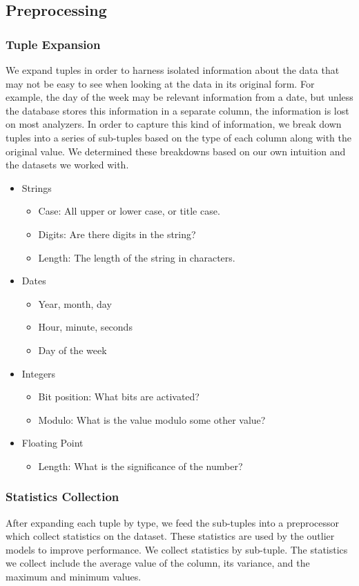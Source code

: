 \documentclass{vldb}
\begin{document}
\subsection{Preprocessing}
\subsubsection{Tuple Expansion}
We expand tuples in order to harness isolated information about the data that may not be easy to see when looking at the data in its original form.
For example, the day of the week may be relevant information from a date, but unless the database stores this information in a separate column, the information is lost on most analyzers.
In order to capture this kind of information, we break down tuples into a series of sub-tuples based on the type of each column along with the original value.
We determined these breakdowns based on our own intuition and the datasets we worked with.

\begin{itemize}
\item Strings
\begin{itemize}
\item Case: All upper or lower case, or title case.
\item Digits: Are there digits in the string?
\item Length: The length of the string in characters.
\end{itemize}
\item Dates
\begin{itemize}
\item Year, month, day
\item Hour, minute, seconds
\item Day of the week
\end{itemize}
\item Integers
\begin{itemize}
\item Bit position: What bits are activated?
\item Modulo: What is the value modulo some other value?
\end{itemize}
\item Floating Point
\begin{itemize}
\item Length: What is the significance of the number?
\end{itemize}
\end{itemize}

\subsubsection{Statistics Collection}
After expanding each tuple by type, we feed the sub-tuples into a preprocessor which collect statistics on the dataset.
These statistics are used by the outlier models to improve performance.
We collect statistics by sub-tuple.
The statistics we collect include the average value of the column, its variance, and the maximum and minimum values. 
\end{document}
